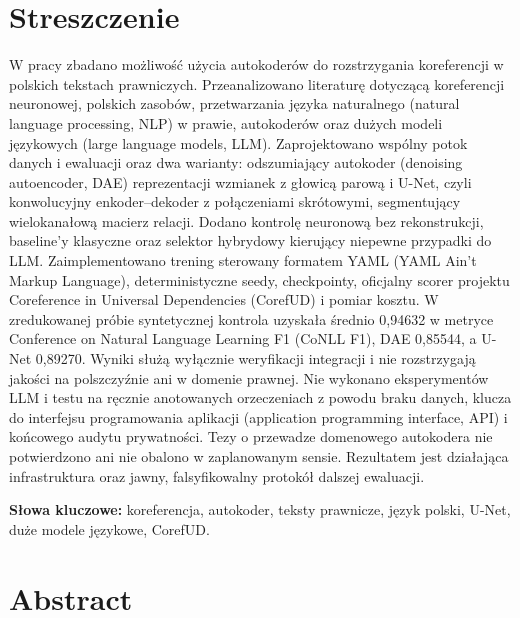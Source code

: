 \chapter*{Streszczenie}

W pracy zbadano możliwość użycia autokoderów do rozstrzygania koreferencji w polskich tekstach prawniczych. Przeanalizowano literaturę dotyczącą koreferencji neuronowej, polskich zasobów, przetwarzania języka naturalnego (natural language processing, NLP) w prawie, autokoderów oraz dużych modeli językowych (large language models, LLM). Zaprojektowano wspólny potok danych i ewaluacji oraz dwa warianty: odszumiający autokoder (denoising autoencoder, DAE) reprezentacji wzmianek z głowicą parową i U-Net, czyli konwolucyjny enkoder--dekoder z połączeniami skrótowymi, segmentujący wielokanałową macierz relacji. Dodano kontrolę neuronową bez rekonstrukcji, baseline’y klasyczne oraz selektor hybrydowy kierujący niepewne przypadki do LLM. Zaimplementowano trening sterowany formatem YAML (YAML Ain't Markup Language), deterministyczne seedy, checkpointy, oficjalny scorer projektu Coreference in Universal Dependencies (CorefUD) i pomiar kosztu. W zredukowanej próbie syntetycznej kontrola uzyskała średnio 0,94632 w metryce Conference on Natural Language Learning F1 (CoNLL F1), DAE 0,85544, a U-Net 0,89270. Wyniki służą wyłącznie weryfikacji integracji i nie rozstrzygają jakości na polszczyźnie ani w domenie prawnej. Nie wykonano eksperymentów LLM i testu na ręcznie anotowanych orzeczeniach z powodu braku danych, klucza do interfejsu programowania aplikacji (application programming interface, API) i końcowego audytu prywatności. Tezy o przewadze domenowego autokodera nie potwierdzono ani nie obalono w zaplanowanym sensie. Rezultatem jest działająca infrastruktura oraz jawny, falsyfikowalny protokół dalszej ewaluacji.

\noindent\textbf{Słowa kluczowe:} koreferencja, autokoder, teksty prawnicze, język polski, U-Net, duże modele językowe, CorefUD.

\chapter*{Abstract}


